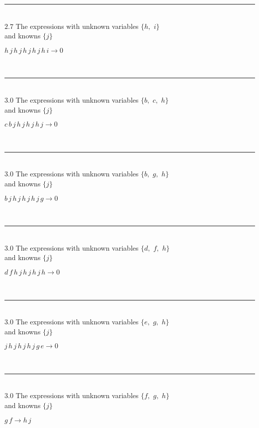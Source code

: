 \documentclass[rep10,leqno]{report}
\begin{document}
\rule[3pt]{6in}{.7pt}\\
$2.7$  The expressions with unknown variables $\{h,
$ $
i\}$\\
and knowns $\{j\}$\smallskip\\
\begin{minipage}{6in}
$
h\,
 j\,
 h\,
 j\,
 h\,
 j\,
 h\,
 j\,
 h\,
 i\rightarrow 0
$
\end{minipage}\\
\rule[3pt]{6in}{.7pt}\\
$3.0$  The expressions with unknown variables $\{b,
$ $
c,
$ $
h\}$\\
and knowns $\{j\}$\smallskip\\
\begin{minipage}{6in}
$
c\,
 b\,
 j\,
 h\,
 j\,
 h\,
 j\,
 h\,
 j\rightarrow 0
$
\end{minipage}\\
\rule[3pt]{6in}{.7pt}\\
$3.0$  The expressions with unknown variables $\{b,
$ $
g,
$ $
h\}$\\
and knowns $\{j\}$\smallskip\\
\begin{minipage}{6in}
$
b\,
 j\,
 h\,
 j\,
 h\,
 j\,
 h\,
 j\,
 g\rightarrow 0
$
\end{minipage}\\
\rule[3pt]{6in}{.7pt}\\
$3.0$  The expressions with unknown variables $\{d,
$ $
f,
$ $
h\}$\\
and knowns $\{j\}$\smallskip\\
\begin{minipage}{6in}
$
d\,
 f\,
 h\,
 j\,
 h\,
 j\,
 h\,
 j\,
 h\rightarrow 0
$
\end{minipage}\\
\rule[3pt]{6in}{.7pt}\\
$3.0$  The expressions with unknown variables $\{e,
$ $
g,
$ $
h\}$\\
and knowns $\{j\}$\smallskip\\
\begin{minipage}{6in}
$
j\,
 h\,
 j\,
 h\,
 j\,
 h\,
 j\,
 g\,
 e\rightarrow 0
$
\end{minipage}\\
\rule[3pt]{6in}{.7pt}\\
$3.0$  The expressions with unknown variables $\{f,
$ $
g,
$ $
h\}$\\
and knowns $\{j\}$\smallskip\\
\begin{minipage}{6in}
$
g\,
 f\rightarrow h\,
 j
$
\end{minipage}\\
\end{document}
